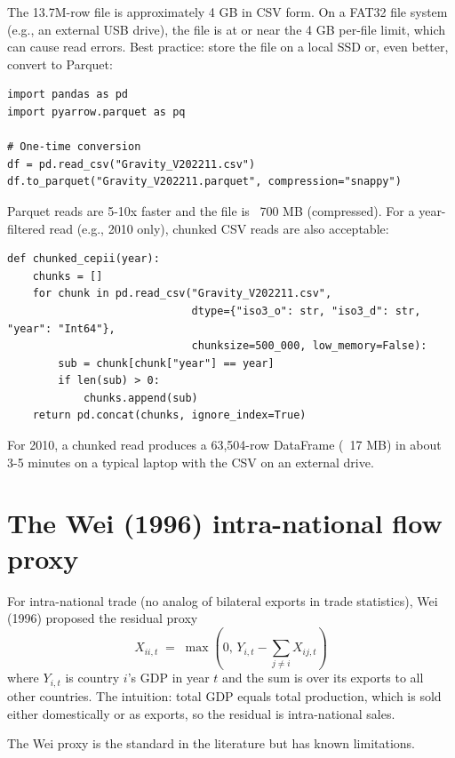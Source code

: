 \documentclass[11pt,letterpaper,oneside]{book}
\theoremstyle{definition}
\theoremstyle{remark}
\begin{document}
The 13.7M-row file is approximately 4 GB in CSV form. On a FAT32 file
system (e.g., an external USB drive), the file is at or near the
4 GB per-file limit, which can cause read errors. Best practice: store
the file on a local SSD or, even better, convert to Parquet:
\begin{lstlisting}
import pandas as pd
import pyarrow.parquet as pq

# One-time conversion
df = pd.read_csv("Gravity_V202211.csv")
df.to_parquet("Gravity_V202211.parquet", compression="snappy")
\end{lstlisting}

Parquet reads are 5-10x faster and the file is ~700 MB (compressed). For
a year-filtered read (e.g., 2010 only), chunked CSV reads are also
acceptable:
\begin{lstlisting}
def chunked_cepii(year):
    chunks = []
    for chunk in pd.read_csv("Gravity_V202211.csv",
                             dtype={"iso3_o": str, "iso3_d": str, "year": "Int64"},
                             chunksize=500_000, low_memory=False):
        sub = chunk[chunk["year"] == year]
        if len(sub) > 0:
            chunks.append(sub)
    return pd.concat(chunks, ignore_index=True)
\end{lstlisting}

For 2010, a chunked read produces a 63{,}504-row DataFrame (~17 MB) in
about 3-5 minutes on a typical laptop with the CSV on an external drive.

\section{The Wei (1996) intra-national flow proxy}

For intra-national trade (no analog of bilateral exports in trade
statistics), Wei (1996) proposed the residual proxy
\begin{equation}
X_{ii,t} \;=\; \max(0, \, Y_{i,t} - \sum_{j \neq i} X_{ij,t})
\end{equation}
where $Y_{i,t}$ is country $i$'s GDP in year $t$ and the sum is over its
exports to all other countries. The intuition: total GDP equals total
production, which is sold either domestically or as exports, so the
residual is intra-national sales.

The Wei proxy is the standard in the literature but has known limitations.
\end{document}
